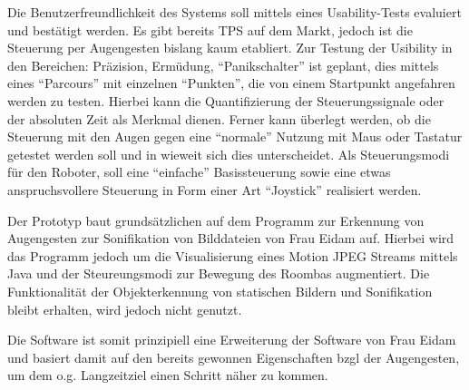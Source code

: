 \documentclass[11pt,a4paper,onecolumn,twoside,ngerman]{book}
\begin{document}

Die Benutzerfreundlichkeit des Systems soll mittels eines Usability-Tests evaluiert und bestätigt werden. Es gibt bereits TPS auf dem Markt, jedoch ist die Steuerung per Augengesten bislang kaum etabliert.
Zur Testung der Usibility in den Bereichen: Präzision, Ermüdung, \enquote{Panikschalter} ist geplant, dies mittels eines \enquote{Parcours} mit einzelnen \enquote{Punkten}, die von einem Startpunkt angefahren werden zu testen. Hierbei kann die Quantifizierung der Steuerungssignale oder der absoluten Zeit als Merkmal dienen. Ferner kann überlegt werden, ob die Steuerung mit den Augen gegen eine \enquote{normale} Nutzung mit Maus oder Tastatur getestet werden soll und in wieweit sich dies unterscheidet. Als Steuerungsmodi für den Roboter, soll eine \enquote{einfache} Basissteuerung sowie eine etwas anspruchsvollere Steuerung in Form einer Art \enquote{Joystick} realisiert werden.

Der Prototyp baut grundsätzlichen auf dem Programm zur Erkennung von Augengesten zur Sonifikation von Bilddateien von Frau Eidam \cite{Eidam2016} auf. Hierbei wird das Programm jedoch um die Visualisierung eines Motion JPEG Streams mittels Java und der Steureungsmodi zur Bewegung des Roombas augmentiert. Die Funktionalität der Objekterkennung von statischen Bildern und Sonifikation bleibt erhalten, wird jedoch nicht genutzt.

Die Software ist somit prinzipiell eine Erweiterung der Software von Frau Eidam und basiert damit auf den bereits gewonnen Eigenschaften bzgl der Augengesten, um dem o.g. Langzeitziel einen Schritt näher zu kommen. 


\newpage
\end{document}
